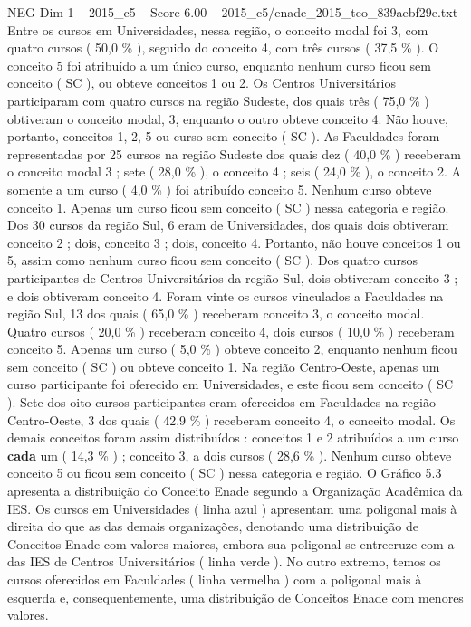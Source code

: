 \begin{textsample}{NEG Dim 1 – 2015\_c5 – Score 6.00 – 2015\_c5/enade\_2015\_teo\_839aebf29e.txt}
Entre os cursos em Universidades, nessa região, o conceito modal foi 3, com quatro cursos ( 50,0 \% ), seguido do conceito 4, com três cursos ( 37,5 \% ).
O conceito 5 foi atribuído a um único curso, enquanto nenhum curso ficou sem conceito ( SC ), ou obteve conceitos 1 ou 2.
Os Centros Universitários participaram com quatro cursos na região Sudeste, dos quais três ( 75,0 \% ) obtiveram o conceito modal, 3, enquanto o outro obteve conceito 4.
Não houve, portanto, conceitos 1, 2, 5 ou curso sem conceito ( SC ).
As Faculdades foram representadas por 25 cursos na região Sudeste dos quais dez ( 40,0 \% ) receberam o conceito modal 3 ; sete ( 28,0 \% ), o conceito 4 ; seis ( 24,0 \% ), o conceito 2.
A somente a um curso ( 4,0 \% ) foi atribuído conceito 5.
Nenhum curso obteve conceito 1.
Apenas um curso ficou sem conceito ( SC ) nessa categoria e região.
Dos 30 cursos da região Sul, 6 eram de Universidades, dos quais dois obtiveram conceito 2 ; dois, conceito 3 ; dois, conceito 4.
Portanto, não houve conceitos 1 ou 5, assim como nenhum curso ficou sem conceito ( SC ).
Dos quatro cursos participantes de Centros Universitários da região Sul, dois obtiveram conceito 3 ; e dois obtiveram conceito 4.
Foram vinte os cursos vinculados a Faculdades na região Sul, 13 dos quais ( 65,0 \% ) receberam conceito 3, o conceito modal.
Quatro cursos ( 20,0 \% ) receberam conceito 4, dois cursos ( 10,0 \% ) receberam conceito 5.
Apenas um curso ( 5,0 \% ) obteve conceito 2, enquanto nenhum ficou sem conceito ( SC ) ou obteve conceito 1.
Na região Centro-Oeste, apenas um curso participante foi oferecido em Universidades, e este ficou sem conceito ( SC ).
Sete dos oito cursos participantes eram oferecidos em Faculdades na região Centro-Oeste, 3 dos quais ( 42,9 \% ) receberam conceito 4, o conceito modal.
Os demais conceitos foram assim distribuídos : conceitos 1 e 2 atribuídos a um curso \textbf{cada} um ( 14,3 \% ) ; conceito 3, a dois cursos ( 28,6 \% ).
Nenhum curso obteve conceito 5 ou ficou sem conceito ( SC ) nessa categoria e região.
O Gráfico 5.3 apresenta a distribuição do Conceito Enade segundo a Organização Acadêmica da IES.
Os cursos em Universidades ( linha azul ) apresentam uma poligonal mais à direita do que as das demais organizações, denotando uma distribuição de Conceitos Enade com valores maiores, embora sua poligonal se entrecruze com a das IES de Centros Universitários ( linha verde ).
No outro extremo, temos os cursos oferecidos em Faculdades ( linha vermelha ) com a poligonal mais à esquerda e, consequentemente, uma distribuição de Conceitos Enade com menores valores.

\end{textsample}
